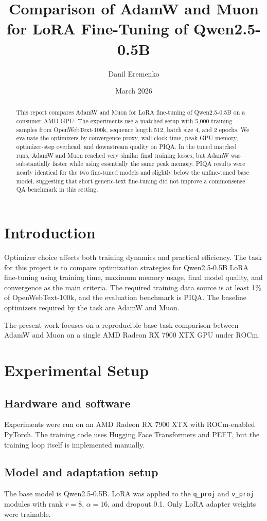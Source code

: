 \documentclass[11pt]{article}
\title{Comparison of AdamW and Muon for LoRA Fine-Tuning of Qwen2.5-0.5B}
\author{Danil Eremenko}
\date{March 2026}
\begin{document}
\maketitle

\begin{abstract}
This report compares AdamW and Muon for LoRA fine-tuning of Qwen2.5-0.5B on a consumer AMD GPU.
The experiments use a matched setup with 5,000 training samples from OpenWebText-100k, sequence length 512, batch size 4, and 2 epochs.
We evaluate the optimizers by convergence proxy, wall-clock time, peak GPU memory, optimizer-step overhead, and downstream quality on PIQA.
In the tuned matched runs, AdamW and Muon reached very similar final training losses, but AdamW was substantially faster while using essentially the same peak memory.
PIQA results were nearly identical for the two fine-tuned models and slightly below the unfine-tuned base model, suggesting that short generic-text fine-tuning did not improve a commonsense QA benchmark in this setting.
\end{abstract}

\section{Introduction}
Optimizer choice affects both training dynamics and practical efficiency.
The task for this project is to compare optimization strategies for Qwen2.5-0.5B LoRA fine-tuning using training time, maximum memory usage, final model quality, and convergence as the main criteria.
The required training data source is at least 1\% of OpenWebText-100k, and the evaluation benchmark is PIQA.
The baseline optimizers required by the task are AdamW and Muon.

The present work focuses on a reproducible base-task comparison between AdamW and Muon on a single AMD Radeon RX 7900 XTX GPU under ROCm.

\section{Experimental Setup}
\subsection{Hardware and software}
Experiments were run on an AMD Radeon RX 7900 XTX with ROCm-enabled PyTorch.
The training code uses Hugging Face Transformers and PEFT, but the training loop itself is implemented manually.

\subsection{Model and adaptation setup}
The base model is Qwen2.5-0.5B.
LoRA was applied to the \texttt{q\_proj} and \texttt{v\_proj} modules with rank $r=8$, $\alpha=16$, and dropout 0.1.
Only LoRA adapter weights were trainable.
\end{document}
